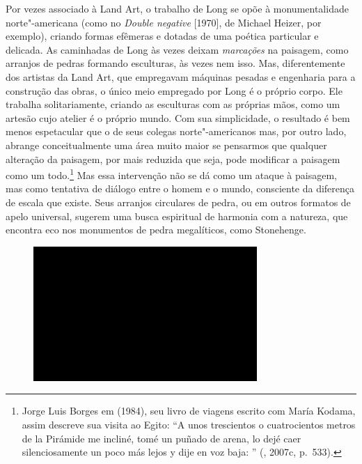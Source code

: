 Por vezes associado à Land Art, o trabalho de Long se opõe à
monumentalidade norte"-americana (como no \emph{Double negative}
{[}1970{]}, de Michael Heizer, por exemplo), criando formas efêmeras e
dotadas de uma poética particular e delicada. As caminhadas de Long às
vezes deixam \emph{marcações} na paisagem, como arranjos de pedras
formando esculturas, às vezes nem isso. Mas, diferentemente dos artistas
da Land Art, que empregavam máquinas pesadas e engenharia para a
construção das obras, o único meio empregado por Long é o próprio corpo.
Ele trabalha solitariamente, criando as esculturas com as próprias mãos,
como um artesão cujo atelier é o próprio mundo. Com sua simplicidade, o
resultado é bem menos espetacular que o de seus colegas norte"-americanos
mas, por outro lado, abrange conceitualmente uma área muito maior se
pensarmos que qualquer alteração da paisagem, por mais reduzida que
seja, pode modificar a paisagem como um todo.\footnote{Jorge Luis Borges
  em {} (1984), seu livro de viagens escrito com María Kodama,
  assim descreve sua visita ao Egito: ``A unos trescientos o
  cuatrocientos metros de la Pirámide me incliné, tomé un puñado de
  arena, lo dejé caer silenciosamente un poco más lejos y dije en voz
  baja: {}'' (, 2007c, p.~533).}
Mas essa intervenção não se dá como um ataque à paisagem, mas como
tentativa de diálogo entre o homem e o mundo, consciente da diferença de
escala que existe. Seus arranjos circulares de pedra, ou em outros
formatos de apelo universal, sugerem uma busca espiritual de harmonia
com a natureza, que encontra eco nos monumentos de pedra megalíticos,
como Stonehenge.

\begin{figure}[!ht]
\centering
 \includegraphics[width=85mm]{./imgs/im1.jpg}
\caption{\tiny{}}
\end{figure}

